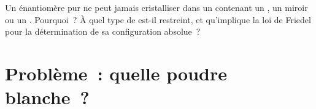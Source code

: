 \begin{exercise}[$\star\star\star$]\label{exo:b3:x-ray-diffraction:12}
Un énantiomère pur ne peut jamais cristalliser dans un 
contenant un , un miroir ou un .
Pourquoi~? À quel type de  est-il restreint, et
qu'implique la loi de Friedel pour la détermination de sa configuration
absolue~?
\end{exercise}

\clearpage
\enlargethispage{3\baselineskip}
\section{Problème~: quelle poudre blanche~?}

